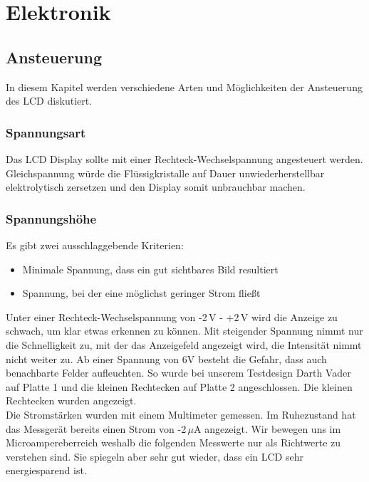 \section{Elektronik}\label{sec:elektronik}
\subsection{Ansteuerung}
In diesem Kapitel werden verschiedene Arten und Möglichkeiten der Ansteuerung des LCD diskutiert.\\

\subsubsection{Spannungsart}
Das LCD Display sollte mit einer Rechteck-Wechselspannung angesteuert werden. Gleichspannung würde die Flüssigkristalle auf Dauer unwiederherstellbar elektrolytisch zersetzen und den Display somit unbrauchbar machen.\\

\subsubsection{Spannungshöhe}\label{subsec:spannung}
Es gibt zwei ausschlaggebende Kriterien:
\begin{itemize}
\item Minimale Spannung, dass ein gut sichtbares Bild resultiert
\item Spannung, bei der eine möglichst geringer Strom fließt\\
\end{itemize}

Unter einer Rechteck-Wechselspannung von -2\,V - +2\,V wird die Anzeige zu schwach, um klar etwas erkennen zu können. Mit steigender Spannung nimmt nur die Schnelligkeit zu, mit der das Anzeigefeld angezeigt wird, die Intensität nimmt nicht weiter zu. Ab einer Spannung von 6V besteht die Gefahr, dass auch benachbarte Felder aufleuchten. So wurde bei unserem Testdesign {\quote Darth Vader} auf Platte 1 und die {\quote kleinen Rechtecken} auf Platte 2 angeschlossen. Die kleinen Rechtecken wurden angezeigt.\\

Die Stromstärken wurden mit einem Multimeter gemessen. Im Ruhezustand hat das Messgerät bereits einen Strom von -2\,$\mu$A 
 angezeigt. Wir bewegen uns im Microampereberreich weshalb die folgenden Messwerte nur als Richtwerte zu verstehen sind. Sie spiegeln aber sehr gut wieder, dass ein LCD sehr energiesparend ist.

